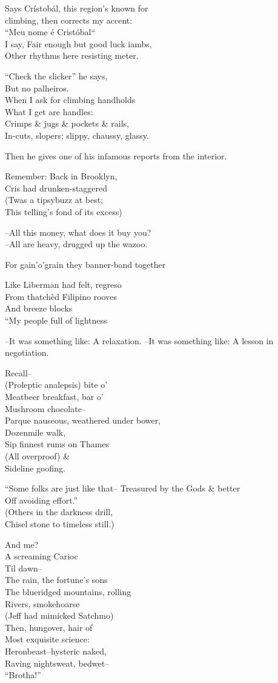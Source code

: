 Says Crístobál, this region's known for \\
climbing, then corrects my accent: \\
``Meu nome é Cristóbal`` \\
I say, Fair enough but good luck iambs, \\
Other rhythms here resisting meter.

``Check the slicker'' he says, \\
But no palheiros. \\
When I ask for climbing handholds \\
What I get are handles: \\
Crimps \& jugs \& pockets \& rails, \\
In-cuts, slopers; slippy, chaussy, glassy. 

Then he gives one of his infamous reports from the interior.

Remember: Back in Brooklyn, \\
Cris had drunken-staggered \\
(Twas a tipsybuzz at best; \\
This telling's fond of its excess) 

--All this money, what does it buy you? \\
--All are heavy, drugged up the wazoo.

For gain'o'grain they banner-band together

Like Liberman had felt, regreso \\
From thatchèd Filipino rooves \\
And breeze blocks \\
``My people full of lightness

--It was something like: A relaxation.
--It was something like: A lesson in negotiation.

Recall-- \\
(Proleptic analepsis) bite o' \\
Meatbeer breakfast, bar o' \\
Mushroom chocolate-- \\
Parque nauseous, weathered under bower, \\
Dozenmile walk, \\
Sip finnest rums on Thames \\
(All overproof) \& \\
Sideline goofing.

``Some folks are just like that--
Treasured by the Gods \& better \\
Off avoiding effort.'' \\
(Others in the darkness drill, \\
Chisel stone to timeless still.)

And me? \\
A screaming Carioc \\
Til dawn-- \\
The rain, the fortune's sons \\
The blueridged mountains, rolling \\
Rivers, smokehoarse \\
(Jeff had mimicked Satchmo) \\
Then, hungover, hair of \\
Most exquisite science: \\
Heronbeast--hysteric naked, \\
Raving nightsweat, bedwet-- \\
``Brotha!''

